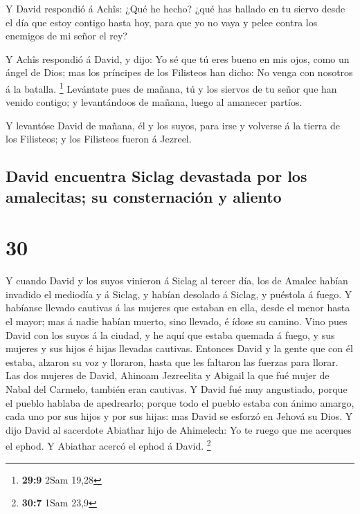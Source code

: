  Y David respondió á Achîs: ¿Qué he hecho? ¿qué has
hallado en tu siervo desde el día que estoy contigo hasta hoy, para que
yo no vaya y pelee contra los enemigos de mi señor el rey?

 Y Achîs respondió á David, y dijo: Yo sé que tú eres
bueno en mis ojos, como un ángel de Dios; mas los príncipes de los
Filisteos han dicho: No venga con nosotros á la batalla. \footnote{\textbf{29:9}
  2Sam 19,28}  Levántate pues de mañana, tú y los siervos
de tu señor que han venido contigo; y levantándoos de mañana, luego al
amanecer partíos.

 Y levantóse David de mañana, él y los suyos, para irse y
volverse á la tierra de los Filisteos; y los Filisteos fueron á Jezreel.

\hypertarget{david-encuentra-siclag-devastada-por-los-amalecitas-su-consternaciuxf3n-y-aliento}{%
\subsection{David encuentra Siclag devastada por los amalecitas; su
consternación y
aliento}\label{david-encuentra-siclag-devastada-por-los-amalecitas-su-consternaciuxf3n-y-aliento}}

\hypertarget{section-29}{%
\section{30}\label{section-29}}

 Y cuando David y los suyos vinieron á Siclag al tercer
día, los de Amalec habían invadido el mediodía y á Siclag, y habían
desolado á Siclag, y puéstola á fuego.  Y habíanse llevado
cautivas á las mujeres que estaban en ella, desde el menor hasta el
mayor; mas á nadie habían muerto, sino llevado, é ídose su camino.
 Vino pues David con los suyos á la ciudad, y he aquí que
estaba quemada á fuego, y sus mujeres y sus hijos é hijas llevadas
cautivas.  Entonces David y la gente que con él estaba,
alzaron su voz y lloraron, hasta que les faltaron las fuerzas para
llorar.  Las dos mujeres de David, Ahinoam Jezreelita y
Abigail la que fué mujer de Nabal del Carmelo, también eran cautivas.
 Y David fué muy angustiado, porque el pueblo hablaba de
apedrearlo; porque todo el pueblo estaba con ánimo amargo, cada uno por
sus hijos y por sus hijas: mas David se esforzó en Jehová su Dios.
 Y dijo David al sacerdote Abiathar hijo de Ahimelech: Yo
te ruego que me acerques el ephod. Y Abiathar acercó el ephod á David.
\footnote{\textbf{30:7} 1Sam 23,9}


